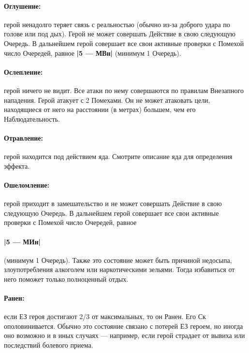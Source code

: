 \paragraph{Оглушение:} герой ненадолго теряет связь с реальностью (обычно из-за доброго удара по голове или под дых). Герой не может совершать Действие в свою следующую Очередь. В дальнейшем герой совершает все свои активные проверки с Помехой число Очередей, равное \textbf{|5 — МВн|} (минимум 1 Очередь).
\paragraph{Ослепление:} герой ничего не видит. Все атаки по нему совершаются по правилам Внезапного нападения. Герой атакует с 2 Помехами. Он не может атаковать цели, находящиеся от него на расстоянии (в метрах) большем, чем его Наблюдательность.
\paragraph{Отравление:} герой находится под действием яда. Смотрите описание яда для определения эффекта.
\paragraph{Ошеломление:} герой приходит в замешательство и не может совершать Действие в свою следующую Очередь. В дальнейшем герой совершает все свои активные проверки с Помехой число Очередей, равное \paragraph{|5 — МИн|} (минимум 1 Очередь). Также это состояние может быть причиной недосыпа, злоупотребления алкоголем или наркотическими зельями. Тогда избавиться от него поможет только полноценный отдых.
\paragraph{Ранен:} если ЕЗ героя достигают 2/3 от максимальных, то он Ранен. Его Ск ополовинивается. Обычно это состояние связано с потерей ЕЗ героем, но иногда оно возможно и в иных случаях — например, если герой страдает от вывиха или последствий болевого приема.
